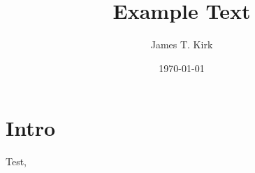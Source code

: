 \documentclass[german]{class}
\title{Example Text}
\author{James T. Kirk}
\date{\today}
\begin{document}
\maketitle

\tableofcontents



\section{Intro}
\cite{goering2021rules}
Test, 

{
\renewcommand{\emph}[1]{\textit{#1}}
\renewcommand{\bibfont}{}
\setlength\bibitemsep{0pt}
\sloppy
\printbibliography
}
\end{document}
